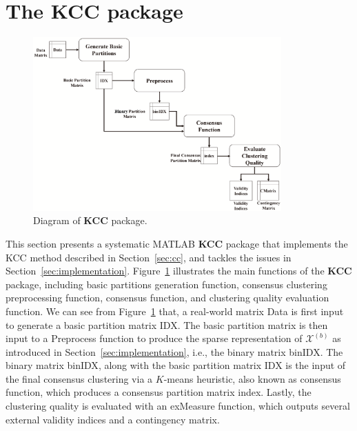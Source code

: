 \documentclass[acmsmall,screen,review]{acmart}
\begin{document}
\maketitle

\section[The KCC package]{The \textbf{KCC} package}\label{sec:package}
\begin{figure}[!bt]
\centering
\includegraphics[width=0.85\textwidth]{fig/soft.eps}
\caption{Diagram of \textbf{KCC} package.}\label{fig:soft} %
\end{figure}

This section presents a systematic MATLAB \textbf{KCC} package that implements the KCC method described in Section~\ref{sec:cc}, and tackles the issues in Section~\ref{sec:implementation}. Figure~\ref{fig:soft} illustrates the main functions of the \textbf{KCC} package, including basic partitions generation function, consensus clustering preprocessing function, consensus function, and clustering quality evaluation function. We can see from Figure~\ref{fig:soft} that, a real-world matrix \textsf{Data} is first input to generate a basic partition matrix \textsf{IDX}. The basic partition matrix is then input to a \textsf{Preprocess} function to produce the sparse representation of $\mathcal{X}^{(b)}$ as introduced in Section~\ref{sec:implementation}, i.e., the binary matrix \textsf{binIDX}. The binary matrix \textsf{binIDX}, along with the basic partition matrix \textsf{IDX} is the input of the final consensus clustering via a $K$-means heuristic, also known as consensus function, which produces a consensus partition matrix \textsf{index}. Lastly, the clustering quality is evaluated with an \textsf{exMeasure} function, which outputs several external validity indices and a contingency matrix.
\end{document}
